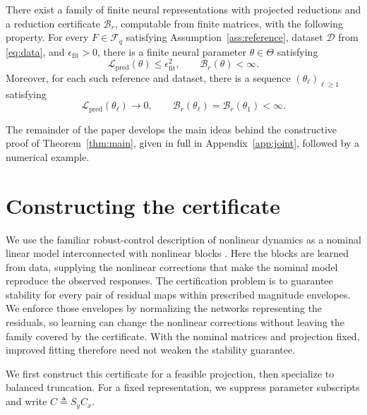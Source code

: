 \documentclass{l4dc2027}
\newcommand{\eqdef}{\triangleq}
\begin{document}
\begin{theorem}\label{thm:main}\leavevmode\par
There exist a family of finite neural representations with projected reductions and a reduction certificate \mbox{$\mathcal B_r$}, computable from finite matrices, with the following property.
For every \mbox{$F\in\mathcal F_q$} satisfying Assumption~\ref{ass:reference}, dataset \mbox{$\mathscr D$} from \eqref{eq:data}, and \mbox{$\epsilon_{\mathrm{fit}}>0$}, there is a finite neural parameter \mbox{$\theta\in\Theta$} satisfying
\[
 \mathcal L_{\mathrm{pred}}(\theta)\le\epsilon_{\mathrm{fit}}^2,
 \qquad
 \mathcal B_r(\theta)<\infty.
\]
Moreover, for each such reference and dataset, there is a sequence \mbox{$(\theta_\ell)_{\ell\ge1}$} satisfying
\[
 \mathcal L_{\mathrm{pred}}(\theta_\ell)\longrightarrow0,
 \qquad
 \mathcal B_r(\theta_\ell)=\mathcal B_r(\theta_1)<\infty.
\]
\end{theorem}

The remainder of the paper develops the main ideas behind the constructive proof of Theorem~\ref{thm:main}, given in full in Appendix~\ref{app:joint}, followed by a numerical example.

\section{Constructing the certificate}\label{sec:construction}

We use the familiar robust-control description of nonlinear dynamics as a nominal linear model interconnected with nonlinear blocks \citep{brown-gramians}.
Here the blocks are learned from data, supplying the nonlinear corrections that make the nominal model reproduce the observed responses.
The certification problem is to guarantee stability for every pair of residual maps within prescribed magnitude envelopes.
We enforce those envelopes by normalizing the networks representing the residuals, so learning can change the nonlinear corrections without leaving the family covered by the certificate.
With the nominal matrices and projection fixed, improved fitting therefore need not weaken the stability guarantee.

We first construct this certificate for a feasible projection, then specialize to balanced truncation.
For a fixed representation, we suppress parameter subscripts and write \mbox{$C\eqdef S_yC_x$}.
\end{document}
